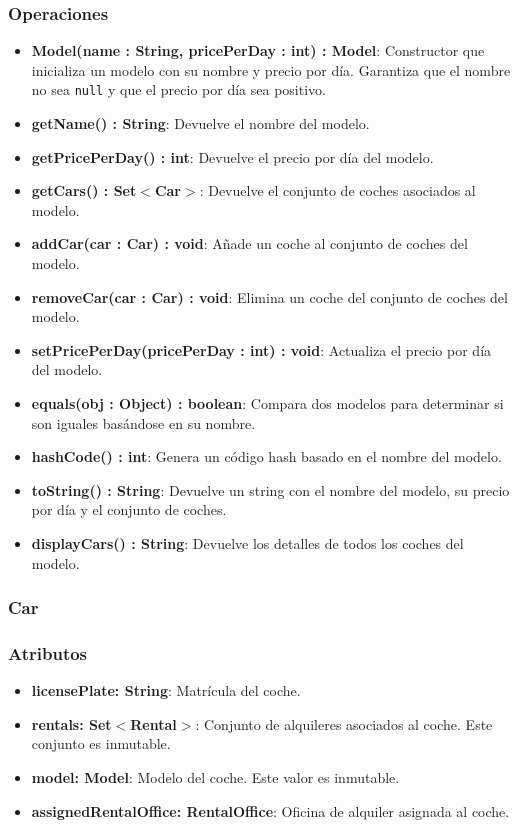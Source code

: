 \subsubsection*{Operaciones}

\begin{itemize}
    \item \textbf{Model(name : String, pricePerDay : int) : Model}: 
    Constructor que inicializa un modelo con su nombre y precio por día. Garantiza que el nombre no sea \texttt{null} y que el precio por día sea positivo.

    \item \textbf{getName() : String}: Devuelve el nombre del modelo.
    \item \textbf{getPricePerDay() : int}: Devuelve el precio por día del modelo.
    \item \textbf{getCars() : Set$<$Car$>$}: Devuelve el conjunto de coches asociados al modelo.
    \item \textbf{addCar(car : Car) : void}: Añade un coche al conjunto de coches del modelo. 
    \item \textbf{removeCar(car : Car) : void}: Elimina un coche del conjunto de coches del modelo.
    \item \textbf{setPricePerDay(pricePerDay : int) : void}: Actualiza el precio por día del modelo.
    \item \textbf{equals(obj : Object) : boolean}: Compara dos modelos para determinar si son iguales basándose en su nombre.
    \item \textbf{hashCode() : int}: Genera un código hash basado en el nombre del modelo.
    \item \textbf{toString() : String}: Devuelve un string con el nombre del modelo, su precio por día y el conjunto de coches.
    \item \textbf{displayCars() : String}: Devuelve los detalles de todos los coches del modelo.
\end{itemize}

\subsubsection{Car}

\subsubsection*{Atributos}

\begin{itemize}
    \item \textbf{licensePlate: String}: Matrícula del coche.
    \item \textbf{rentals: Set$<$Rental$>$}: Conjunto de alquileres asociados al coche. Este conjunto es inmutable.
    \item \textbf{model: Model}: Modelo del coche. Este valor es inmutable.
    \item \textbf{assignedRentalOffice: RentalOffice}: Oficina de alquiler asignada al coche.
\end{itemize}

